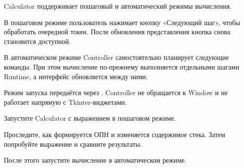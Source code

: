 Calculator поддерживает пошаговый и автоматический
режимы вычисления.

В пошаговом режиме пользователь нажимает кнопку
«Следующий шаг», чтобы обработать очередной токен.
После обновления представления кнопка снова
становится доступной.

В автоматическом режиме Controller самостоятельно
планирует следующие команды. При этом вычисление
по-прежнему выполняется отдельными шагами Runtime,
а интерфейс обновляется между ними.

Режим запуска передаётся через .
Controller не обращается к Window и не работает
напрямую с Tkinter-виджетами.

\begin{trybox}
Запустите Calculator с выражением 
в пошаговом режиме.

Проследите, как формируется ОПН и изменяется
содержимое стека. Затем попробуйте выражение
 и сравните результаты.

После этого запустите вычисление в автоматическом
режиме.
\end{trybox}
